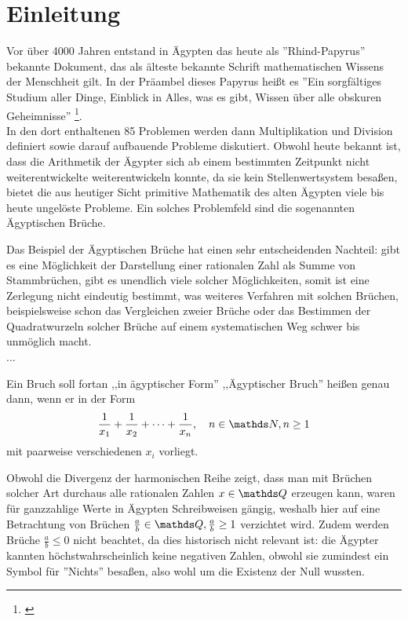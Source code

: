 \section{Einleitung}\label{sec:arithmetic}
Vor über 4000 Jahren entstand in Ägypten das heute als ''Rhind-Papyrus'' bekannte Dokument, das als älteste bekannte Schrift mathematischen Wissens der Menschheit gilt. In der Präambel dieses Papyrus heißt es ''Ein sorgfältiges Studium aller Dinge, Einblick in Alles, was es gibt, Wissen über alle obskuren Geheimnisse'' \footnote{\cite[S. 37, Übersetzung durch den Autor]{Burton2011}}.\\ In den dort enthaltenen 85 Problemen werden dann Multiplikation und Division definiert sowie darauf aufbauende Probleme diskutiert. Obwohl heute bekannt ist, dass die Arithmetik der Ägypter sich ab einem bestimmten Zeitpunkt nicht weiterentwickelte \bzw weiterentwickeln konnte, da sie  kein Stellenwertsystem besaßen, bietet die aus heutiger Sicht primitive Mathematik des alten Ägypten viele bis heute ungelöste Probleme. Ein solches Problemfeld sind die sogenannten Ägyptischen Brüche.

Das Beispiel der Ägyptischen Brüche hat einen sehr entscheidenden Nachteil: gibt es eine Möglichkeit der Darstellung einer rationalen Zahl als Summe von Stammbrüchen, gibt es unendlich viele solcher Möglichkeiten, somit ist eine Zerlegung nicht eindeutig bestimmt, was weiteres Verfahren mit solchen Brüchen, beispielsweise schon das Vergleichen zweier Brüche oder das Bestimmen der Quadratwurzeln solcher Brüche auf einem systematischen Weg schwer bis unmöglich macht. \cite[S.62]{Resnikoff1984}
\\...

\begin{def1}\label{def:egypfrac}
	Ein Bruch soll fortan ,,in ägyptischer Form'' \bzw  ,,Ägyptischer Bruch'' heißen genau dann, wenn er in der Form
	$$\uf{x_1} + \uf{x_2} + \cdots + \uf{x_n}, \quad n \in \N, n \ge 1$$
	mit paarweise verschiedenen $x_i$ vorliegt.
\end{def1}

Obwohl die Divergenz der harmonischen Reihe zeigt, dass man mit Brüchen solcher Art durchaus alle rationalen Zahlen $x \in \Q$ erzeugen kann, waren für ganzzahlige Werte in Ägypten Schreibweisen gängig, weshalb hier auf eine Betrachtung von Brüchen $\frac{a}{b}\in \Q, \frac{a}{b} \geq 1$ verzichtet wird. Zudem werden Brüche $\frac{a}{b} \leq 0$ nicht beachtet, da dies historisch nicht relevant ist: die Ägypter kannten höchstwahrscheinlich keine negativen Zahlen, obwohl sie zumindest ein Symbol für ''Nichts'' besaßen, also wohl um die Existenz der Null wussten.